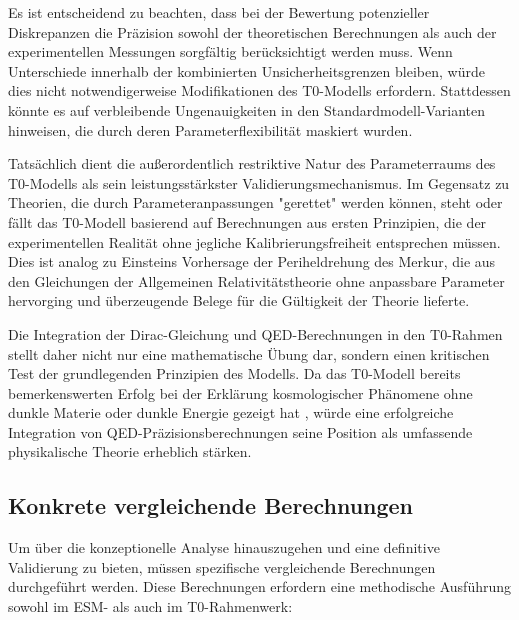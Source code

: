 \documentclass[12pt,a4paper]{article}
\begin{document}
	Es ist entscheidend zu beachten, dass bei der Bewertung potenzieller Diskrepanzen die Präzision sowohl der theoretischen Berechnungen als auch der experimentellen Messungen sorgfältig berücksichtigt werden muss. Wenn Unterschiede innerhalb der kombinierten Unsicherheitsgrenzen bleiben, würde dies nicht notwendigerweise Modifikationen des T0-Modells erfordern. Stattdessen könnte es auf verbleibende Ungenauigkeiten in den Standardmodell-Varianten hinweisen, die durch deren Parameterflexibilität maskiert wurden.
	
	Tatsächlich dient die außerordentlich restriktive Natur des Parameterraums des T0-Modells als sein leistungsstärkster Validierungsmechanismus. Im Gegensatz zu Theorien, die durch Parameteranpassungen "gerettet" werden können, steht oder fällt das T0-Modell basierend auf Berechnungen aus ersten Prinzipien, die der experimentellen Realität ohne jegliche Kalibrierungsfreiheit entsprechen müssen. Dies ist analog zu Einsteins Vorhersage der Periheldrehung des Merkur, die aus den Gleichungen der Allgemeinen Relativitätstheorie ohne anpassbare Parameter hervorging und überzeugende Belege für die Gültigkeit der Theorie lieferte.
	
	Die Integration der Dirac-Gleichung und QED-Berechnungen in den T0-Rahmen stellt daher nicht nur eine mathematische Übung dar, sondern einen kritischen Test der grundlegenden Prinzipien des Modells. Da das T0-Modell bereits bemerkenswerten Erfolg bei der Erklärung kosmologischer Phänomene ohne dunkle Materie oder dunkle Energie gezeigt hat \cite{pascher_emergente_2025}, würde eine erfolgreiche Integration von QED-Präzisionsberechnungen seine Position als umfassende physikalische Theorie erheblich stärken.
	
	\subsection{Konkrete vergleichende Berechnungen}
	\label{subsec:comparative_calculations}
	
	Um über die konzeptionelle Analyse hinauszugehen und eine definitive Validierung zu bieten, müssen spezifische vergleichende Berechnungen durchgeführt werden. Diese Berechnungen erfordern eine methodische Ausführung sowohl im ESM- als auch im T0-Rahmenwerk:
	
\end{document}
